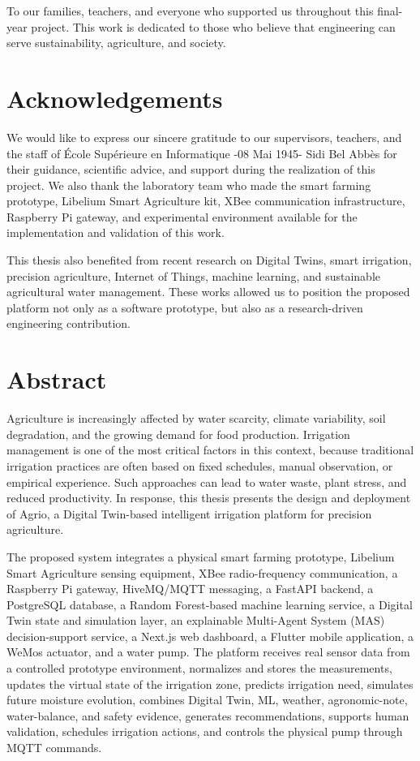 To our families, teachers, and everyone who supported us throughout this final-year project. This work is dedicated to those who believe that engineering can serve sustainability, agriculture, and society.

\chapter*{Acknowledgements}

We would like to express our sincere gratitude to our supervisors, teachers, and the staff of École Supérieure en Informatique -08 Mai 1945- Sidi Bel Abbès for their guidance, scientific advice, and support during the realization of this project. We also thank the laboratory team who made the smart farming prototype, Libelium Smart Agriculture kit, XBee communication infrastructure, Raspberry Pi gateway, and experimental environment available for the implementation and validation of this work.

This thesis also benefited from recent research on Digital Twins, smart irrigation, precision agriculture, Internet of Things, machine learning, and sustainable agricultural water management. These works allowed us to position the proposed platform not only as a software prototype, but also as a research-driven engineering contribution.

\chapter*{Abstract}

Agriculture is increasingly affected by water scarcity, climate variability, soil degradation, and the growing demand for food production. Irrigation management is one of the most critical factors in this context, because traditional irrigation practices are often based on fixed schedules, manual observation, or empirical experience. Such approaches can lead to water waste, plant stress, and reduced productivity. In response, this thesis presents the design and deployment of Agrio, a Digital Twin-based intelligent irrigation platform for precision agriculture.

The proposed system integrates a physical smart farming prototype, Libelium Smart Agriculture sensing equipment, XBee radio-frequency communication, a Raspberry Pi gateway, HiveMQ/MQTT messaging, a FastAPI backend, a PostgreSQL database, a Random Forest-based machine learning service, a Digital Twin state and simulation layer, an explainable Multi-Agent System (MAS) decision-support service, a Next.js web dashboard, a Flutter mobile application, a WeMos actuator, and a water pump. The platform receives real sensor data from a controlled prototype environment, normalizes and stores the measurements, updates the virtual state of the irrigation zone, predicts irrigation need, simulates future moisture evolution, combines Digital Twin, ML, weather, agronomic-note, water-balance, and safety evidence, generates recommendations, supports human validation, schedules irrigation actions, and controls the physical pump through MQTT commands.

